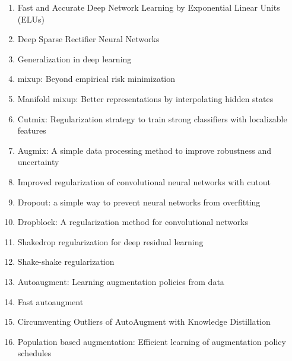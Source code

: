 \documentclass[acmlarge]{acmart}
\begin{document}
\begin{enumerate}
	\item Fast and Accurate Deep Network Learning by Exponential Linear Units (ELUs) \cite{clevert2015fast} 

	\item Deep Sparse Rectifier Neural Networks \cite{pmlr-v15-glorot11a} 

	\item Generalization in deep learning \cite{kawaguchi2017generalization} 

	\item mixup: Beyond empirical risk minimization \cite{zhang2017mixup} 

	\item Manifold mixup: Better representations by interpolating hidden states \cite{verma2019manifold} 

	\item Cutmix: Regularization strategy to train strong classifiers with localizable features \cite{yun2019cutmix} 

	\item Augmix: A simple data processing method to improve robustness and uncertainty \cite{hendrycks2019augmix} 

	\item Improved regularization of convolutional neural networks with cutout \cite{devries2017improved} 

	\item Dropout: a simple way to prevent neural networks from overfitting \cite{srivastava2014dropout} 

	\item Dropblock: A regularization method for convolutional networks \cite{ghiasi2018dropblock} 

	\item Shakedrop regularization for deep residual learning \cite{yamada2019shakedrop} 

	\item Shake-shake regularization \cite{gastaldi2017shake} 

	\item Autoaugment: Learning augmentation policies from data \cite{cubuk2018autoaugment} 

	\item Fast autoaugment \cite{lim2019fast} 

	\item Circumventing Outliers of AutoAugment with Knowledge Distillation \cite{wei2020circumventing} 

	\item Population based augmentation: Efficient learning of augmentation policy schedules \cite{ho2019population} 


\end{enumerate}
\end{document}
